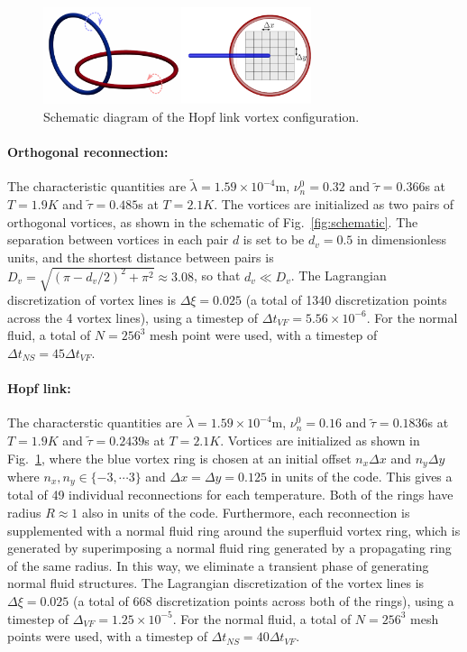 \documentclass[%
superscriptaddress,
 amsmath,amssymb,
prl,
prb,
]{revtex4-2}
\begin{document}
\begin{figure}
	\centering
	\includegraphics[width=0.7\textwidth]{hopflink-snapshot.pdf}
	\caption{Schematic diagram of the Hopf link vortex configuration.}
	\label{fig:Hopf-link}
\end{figure}

\paragraph{Orthogonal reconnection:} The characteristic quantities are $\tilde{\lambda}=1.59\times10^{-4}$m, $\nu_n^0=0.32$ and $\tilde{\tau}=0.366$s at $T=1.9K$ and $\tilde{\tau}=0.485$s at $T=2.1K$. The vortices are initialized as two pairs of orthogonal vortices, as shown in the schematic of Fig.~\ref{fig:schematic}. The separation between vortices in each pair $d$ is set to be $d_v=0.5$ in dimensionless units, and the shortest distance between pairs is $D_v=\sqrt{(\pi-d_v/2)^2+\pi^2}\approx 3.08$, so that $d_v\ll D_v$. The Lagrangian discretization of vortex lines is $\Delta \xi = 0.025$ (a total of 1340 discretization points across the 4 vortex lines), using a timestep of $\Delta t_{VF} = 5.56\times10^{-6}$. For the normal fluid, a total of $N=256^3$ mesh point were used, with a timestep of $\Delta t_{NS} = 45\Delta t_{VF}$. \\

\paragraph{Hopf link:} The characterstic quantities are $\tilde{\lambda}=1.59\times10^{-4}$m, $\nu_n^0=0.16$ and $\tilde{\tau}=0.1836$s at $T=1.9K$ and $\tilde{\tau}=0.2439$s at $T=2.1K$. Vortices are initialized as shown in Fig.~\ref{fig:Hopf-link}, where the blue vortex ring is chosen at an initial offset $n_x\Delta x$ and $n_y \Delta y$ where $n_x,n_y\in\lbrace-3,\cdots 3\rbrace$ and $\Delta x = \Delta y = 0.125$ in units of the code. This gives a total of 49 individual reconnections for each temperature. Both of the rings have radius $R\approx 1$ also in units of the code. Furthermore, each reconnection is supplemented with a normal fluid ring around the superfluid vortex ring, which is generated by superimposing a normal fluid ring generated by a propagating ring of the same radius. In this way, we eliminate a transient phase of generating normal fluid structures. The Lagrangian discretization of the vortex lines is $\Delta\xi = 0.025$ (a total of 668 discretization points across both of the rings), using a timestep of $\Delta_{VF} = 1.25\times 10^{-5}$. For the normal fluid, a total of $N=256^3$ mesh points were used, with a timestep of $\Delta t_{NS} = 40\Delta t_{VF}$. 

\end{document}
